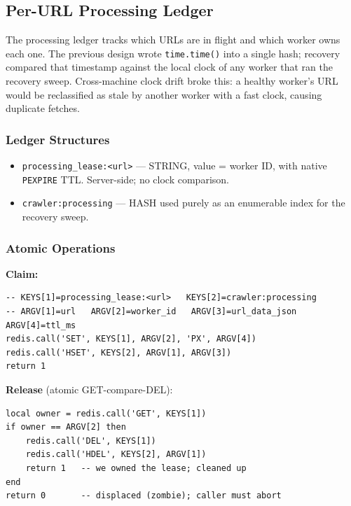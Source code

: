 \documentclass[11pt,a4paper]{article}
\newcommand{\code}[1]{\texttt{#1}}
\begin{document}
\subsection{Per-URL Processing Ledger}
\label{sec:ledger}

The processing ledger tracks which URLs are in flight and which worker owns each one. The previous design wrote \code{time.time()} into a single hash; recovery compared that timestamp against the local clock of any worker that ran the recovery sweep. Cross-machine clock drift broke this: a healthy worker's URL would be reclassified as stale by another worker with a fast clock, causing duplicate fetches.

\subsubsection{Ledger Structures}

\begin{itemize}[leftmargin=1.4em]
  \item \code{processing\_lease:<url>} --- STRING, value = worker ID, with native \code{PEXPIRE} TTL. Server-side; no clock comparison.
  \item \code{crawler:processing} --- HASH used purely as an enumerable index for the recovery sweep.
\end{itemize}

\subsubsection{Atomic Operations}

\textbf{Claim:}

\begin{lstlisting}
-- KEYS[1]=processing_lease:<url>   KEYS[2]=crawler:processing
-- ARGV[1]=url   ARGV[2]=worker_id   ARGV[3]=url_data_json   ARGV[4]=ttl_ms
redis.call('SET', KEYS[1], ARGV[2], 'PX', ARGV[4])
redis.call('HSET', KEYS[2], ARGV[1], ARGV[3])
return 1
\end{lstlisting}

\textbf{Release} (atomic GET-compare-DEL):

\begin{lstlisting}
local owner = redis.call('GET', KEYS[1])
if owner == ARGV[2] then
    redis.call('DEL', KEYS[1])
    redis.call('HDEL', KEYS[2], ARGV[1])
    return 1   -- we owned the lease; cleaned up
end
return 0       -- displaced (zombie); caller must abort
\end{lstlisting}
\end{document}
